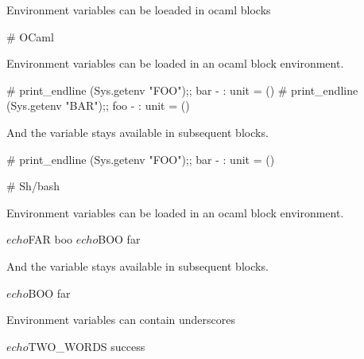 Environment variables can be loeaded in ocaml blocks

# OCaml

Environment variables can be loaded in an ocaml block environment.

\begin{ocaml}
  # print_endline (Sys.getenv "FOO");;
  bar
  - : unit = ()
  # print_endline (Sys.getenv "BAR");;
  foo
  - : unit = ()
\end{ocaml}

And the variable stays available in subsequent blocks.

\begin{ocaml}
  # print_endline (Sys.getenv "FOO");;
  bar
  - : unit = ()
\end{ocaml}

# Sh/bash

Environment variables can be loaded in an ocaml block environment.

\begin{sh}
  $ echo $FAR
  boo
  $ echo $BOO
  far
\end{sh}

And the variable stays available in subsequent blocks.

\begin{sh}
  $ echo $BOO
  far
\end{sh}

Environment variables can contain underscores

\begin{sh}
  $ echo $TWO_WORDS
  success
\end{sh}
